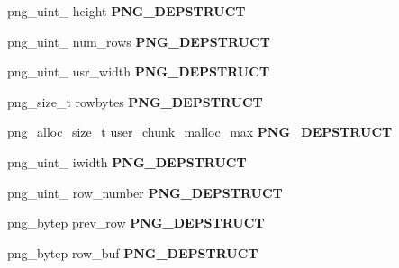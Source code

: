\begin{DoxyCompactItemize}
\item 
png\+\_\+uint\+\_ height {\bfseries P\+N\+G\+\_\+\+D\+E\+P\+S\+T\+R\+U\+CT}\hypertarget{structpng__struct__def_ad12711921edaad9cb500074b1542aac4}{}\label{structpng__struct__def_ad12711921edaad9cb500074b1542aac4}

\item 
png\+\_\+uint\+\_ num\+\_\+rows {\bfseries P\+N\+G\+\_\+\+D\+E\+P\+S\+T\+R\+U\+CT}\hypertarget{structpng__struct__def_a67a3a12d0d8e8cfbb11d5683b51df050}{}\label{structpng__struct__def_a67a3a12d0d8e8cfbb11d5683b51df050}

\item 
png\+\_\+uint\+\_ usr\+\_\+width {\bfseries P\+N\+G\+\_\+\+D\+E\+P\+S\+T\+R\+U\+CT}\hypertarget{structpng__struct__def_a2baaeace131d4c0c110310ce65749b83}{}\label{structpng__struct__def_a2baaeace131d4c0c110310ce65749b83}

\item 
png\+\_\+size\+\_\+t rowbytes {\bfseries P\+N\+G\+\_\+\+D\+E\+P\+S\+T\+R\+U\+CT}\hypertarget{structpng__struct__def_aaca731c9e228ac1faf54c91e80729ab8}{}\label{structpng__struct__def_aaca731c9e228ac1faf54c91e80729ab8}

\item 
png\+\_\+alloc\+\_\+size\+\_\+t user\+\_\+chunk\+\_\+malloc\+\_\+max {\bfseries P\+N\+G\+\_\+\+D\+E\+P\+S\+T\+R\+U\+CT}\hypertarget{structpng__struct__def_afc1ffb9ae20888cfa6f27457c403d6ea}{}\label{structpng__struct__def_afc1ffb9ae20888cfa6f27457c403d6ea}

\item 
png\+\_\+uint\+\_ iwidth {\bfseries P\+N\+G\+\_\+\+D\+E\+P\+S\+T\+R\+U\+CT}\hypertarget{structpng__struct__def_a983dfd5a7f36c3306112e43b18ca314f}{}\label{structpng__struct__def_a983dfd5a7f36c3306112e43b18ca314f}

\item 
png\+\_\+uint\+\_ row\+\_\+number {\bfseries P\+N\+G\+\_\+\+D\+E\+P\+S\+T\+R\+U\+CT}\hypertarget{structpng__struct__def_a4c44f56eb680be3be254f835eb543f44}{}\label{structpng__struct__def_a4c44f56eb680be3be254f835eb543f44}

\item 
png\+\_\+bytep prev\+\_\+row {\bfseries P\+N\+G\+\_\+\+D\+E\+P\+S\+T\+R\+U\+CT}\hypertarget{structpng__struct__def_aee3ed35a2a7271d7bcd4c215d4a4e47d}{}\label{structpng__struct__def_aee3ed35a2a7271d7bcd4c215d4a4e47d}

\item 
png\+\_\+bytep row\+\_\+buf {\bfseries P\+N\+G\+\_\+\+D\+E\+P\+S\+T\+R\+U\+CT}\hypertarget{structpng__struct__def_ab94e4fb0f3d3767af075972e03eaaff6}{}\label{structpng__struct__def_ab94e4fb0f3d3767af075972e03eaaff6}


\end{DoxyCompactItemize}
